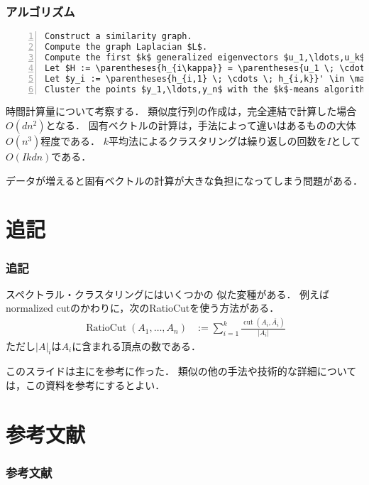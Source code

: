 \documentclass[10pt,hyperref={unicode}]{beamer}
\DeclareMathOperator*{\cut}{cut}
\DeclareMathOperator*{\RatioCut}{RatioCut}
\newcommand{\absolute}[1]{\left|#1\right|}
\newcommand{\parentheses}[1]{\left(#1\right)}
\begin{document}
\begin{frame}[fragile]
\frametitle{アルゴリズム}
\begin{lstlisting}[title={\texttt{Normalized spectral clustering according to Shi and Malik}},mathescape,numbers=left,breaklines]
Construct a similarity graph.
Compute the graph Laplacian $L$.
Compute the first $k$ generalized eigenvectors $u_1,\ldots,u_k$ of the generalized eigenproblem $Lu = \lambda Du$.
Let $H := \parentheses{h_{i\kappa}} = \parentheses{u_1 \; \cdots \; u_k} \in \mathbb{R}^{n \times k}$.
Let $y_i := \parentheses{h_{i,1} \; \cdots \; h_{i,k}}' \in \mathbb{R}^k\,\parentheses{i = 1,\ldots,n}$.
Cluster the points $y_1,\ldots,y_n$ with the $k$-means algorithm into clusters $C_1,\ldots,C_k$.
\end{lstlisting}

\bigskip

時間計算量について考察する．
類似度行列の作成は，完全連結で計算した場合$O\parentheses{dn^2}$となる．
固有ベクトルの計算は，手法によって違いはあるものの大体$O\parentheses{n^3}$程度である．
$k$平均法によるクラスタリングは繰り返しの回数を$I$として$O\parentheses{Ikdn}$である．

\bigskip

データが増えると固有ベクトルの計算が大きな負担になってしまう問題がある．
\end{frame}

\section{追記}
\begin{frame}
\frametitle{追記}
スペクトラル・クラスタリングにはいくつかの
似た変種がある．
例えばnormalized cutのかわりに，次のRatioCutを使う方法がある．
\begin{align*}
    \RatioCut \parentheses{A_1,\ldots,A_n}
    &:= \sum_{i = 1}^k \frac{\cut\parentheses{A_i,\overline{A_i}}}{\absolute{A_i}}
\end{align*}
ただし$\absolute{A}_i$は$A_i$に含まれる頂点の数である．

\bigskip

このスライドは主に\cite{luxburg2007spectral}を参考に作った．
類似の他の手法や技術的な詳細については，この資料を参考にするとよい．

\end{frame}

\section{参考文献}
\begin{frame}
\frametitle{参考文献}


\end{frame}
\end{document}
